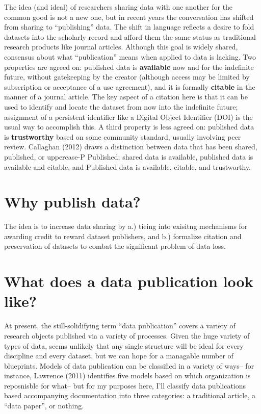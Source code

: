 \documentclass{article}
\begin{document}
The idea (and ideal) of researchers sharing data with one another for the common good is not a new one, but in recent years the conversation has shifted from sharing to ``publishing'' data.
The shift in language reflects a desire to fold datasets into the scholarly record and afford them the same status as traditional research products like journal articles.
Although this goal is widely shared, consensus about what ``publication'' means when applied to data is lacking.
Two properties are agreed on: published data is \textbf{available} now and for the indefinite future, without gatekeeping by the creator (although access may be limited by subscription or acceptance of a use agreement), and it is formally \textbf{citable} in the manner of a journal article.
The key aspect of a citation here is that it can be used to identify and locate the dataset from now into the indefinite future; assignment of a persistent identifier like a Digital Object Identifier (DOI) is the usual way to accomplish this.
A third property is less agreed on: published data is \textbf{trustworthy} based on some community standard, usually involving peer review.
Callaghan (2012) draws a distinction between data that has been shared, published, or uppercase-P Published; shared data is available, published data is available and citable, and Published data is available, citable, and trustworthy.

\section{Why publish data?}\label{why-publish-data}

The idea is to increase data sharing by a.) tieing into exisitng mechanisms for awarding credit to reward dataset publishers, and b.) formalize citation and preservation of datasets to combat the significant problem of data loss.

\section{What does a data publication look like?}\label{what-does-a-data-publication-look-like}

At present, the still-solidifying term ``data publication'' covers a variety of research objects published via a variety of processes.
Given the huge variety of types of data, seems unlikely that any single structure will be ideal for every discipline and every dataset, but we can hope for a managable number of blueprints. Models of data publication can be classified in a variety of ways-- for instance, Lawrence (2011) identifies five models based on which organization is reposnisble for what-- but for my purposes here, I'll classify data publications based accompanying documentation into three categories: a traditional article, a ``data paper'', or nothing.
\end{document}
